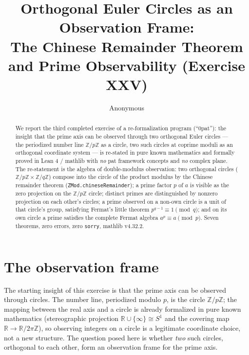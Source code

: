 \documentclass[sigplan,10pt,anonymous,review]{acmart}
\begin{document}
\title{Orthogonal Euler Circles as an Observation Frame:\\ The Chinese
Remainder Theorem and Prime Observability (Exercise XXV)}

\author{Anonymous}

\begin{abstract}
We report the third completed exercise of a re-formalization program
(``0pat''): the insight that the prime axis can be observed through two
orthogonal Euler circles --- the periodized number line $\mathbb{Z}/p\mathbb{Z}$
as a circle, two such circles at coprime moduli as an orthogonal coordinate
system --- is re-stated in pure known mathematics and formally proved in
Lean 4 / mathlib with \emph{no} pat framework concepts and \emph{no}
complex plane. The re-statement is the algebra of double-modulus
observation: two orthogonal circles ($\mathbb{Z}/p\mathbb{Z} \times
\mathbb{Z}/q\mathbb{Z}$) compose into the circle of the product modulus
by the Chinese remainder theorem
(\texttt{ZMod.chineseRemainder}); a prime factor $p$ of $a$ is visible
as the zero projection on the $\mathbb{Z}/p\mathbb{Z}$ circle; distinct
primes are distinguished by nonzero projection on each other's circles;
a prime observed on a non-own circle is a unit of that circle's group,
satisfying Fermat's little theorem $p^{q-1} \equiv 1 \pmod q$; and on
its own circle a prime satisfies the complete Fermat algebra
$a^p \equiv a \pmod p$. Seven theorems, zero errors, zero
\texttt{sorry}, mathlib v4.32.2.
\end{abstract}


\maketitle

\section{The observation frame}

The starting insight of this exercise is that the prime axis can be
observed through circles. The number line, periodized modulo $p$, is the
circle $\mathbb{Z}/p\mathbb{Z}$; the mapping between the real axis and a
circle is already formalized in pure known mathematics (stereographic
projection $\mathbb{R} \cup \{\infty\} \cong S^1$ and the covering map
$\mathbb{R} \to \mathbb{R}/2\pi\mathbb{Z}$), so observing integers on a
circle is a legitimate coordinate choice, not a new structure. The
question posed here is whether \emph{two} such circles, orthogonal to
each other, form an observation frame for the prime axis.
\end{document}
